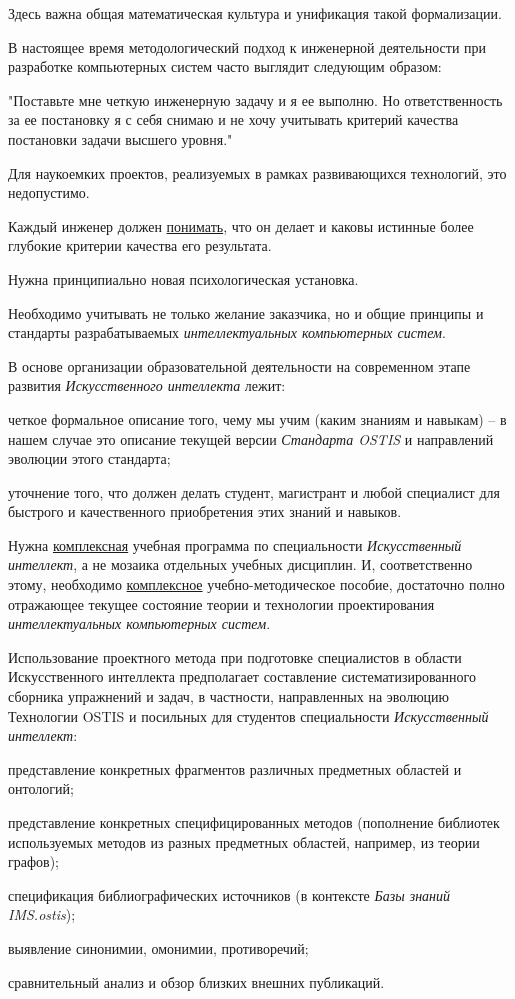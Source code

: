 \begin{SCn}
{Здесь важна общая математическая культура и унификация такой формализации.

В настоящее время методологический подход к инженерной деятельности при разработке компьютерных систем часто выглядит следующим образом:

"Поставьте мне четкую инженерную задачу и я ее выполню. Но ответственность за ее постановку я с себя снимаю и не хочу учитывать критерий качества постановки задачи высшего уровня."{}

Для наукоемких проектов, реализуемых в рамках развивающихся технологий, это недопустимо.

Каждый инженер должен \uline{понимать}, что он делает и каковы истинные более глубокие критерии качества его результата.

Нужна принципиально новая психологическая установка.

Необходимо учитывать не только желание заказчика, но и общие принципы и стандарты разрабатываемых \textit{интеллектуальных компьютерных систем}.

В основе организации образовательной деятельности на современном этапе развития \textit{Искусственного интеллекта} лежит:
\begin{scnitemize}
	\item четкое формальное описание того, чему мы учим (каким знаниям и навыкам) -- в нашем случае это описание текущей версии \textit{Стандарта OSTIS} и направлений эволюции этого стандарта;
	\item уточнение того, что должен делать студент, магистрант и любой специалист для быстрого и качественного приобретения этих знаний и навыков.
\end{scnitemize}

Нужна \uline{комплексная} учебная программа по специальности \textit{Искусственный интеллект}, а не мозаика отдельных учебных дисциплин. И, соответственно этому, необходимо \uline{комплексное} учебно-методическое пособие, достаточно полно отражающее текущее состояние теории и технологии проектирования \textit{интеллектуальных компьютерных систем}.

Использование проектного метода при подготовке специалистов в области Искусственного интеллекта предполагает составление систематизированного сборника упражнений и задач, в частности, направленных на эволюцию Технологии OSTIS и посильных для студентов специальности \textit{Искусственный интеллект}:
\begin{scnitemize}
	\item представление конкретных фрагментов различных предметных областей и онтологий;	
	\item представление конкретных специфицированных методов (пополнение библиотек используемых методов из разных предметных областей, например, из теории графов);
	\item спецификация библиографических источников (в контексте \textit{Базы знаний IMS.ostis});
	\item выявление синонимии, омонимии, противоречий;
	\item сравнительный анализ и обзор близких внешних публикаций.
\end{scnitemize}

}
\end{SCn}
